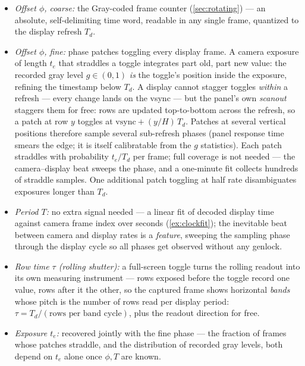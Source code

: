 \documentclass[11pt]{article}
\theoremstyle{definition}
\begin{document}
\begin{itemize}
  \item \emph{Offset $\phi$, coarse:} the Gray-coded frame counter
        (\autoref{sec:rotating}) --- an absolute, self-delimiting time
        word, readable in any single frame, quantized to the display
        refresh $T_d$.
  \item \emph{Offset $\phi$, fine:} phase patches toggling every display
        frame. A camera exposure of length $t_e$ that straddles a toggle
        integrates part old, part new value: the recorded gray level
        $g\in(0,1)$ \emph{is} the toggle's position inside the exposure,
        refining the timestamp below $T_d$. A display cannot stagger
        toggles \emph{within} a refresh --- every change lands on the
        vsync --- but the panel's own \emph{scanout} staggers them for
        free: rows are updated top-to-bottom across the refresh, so a
        patch at row $y$ toggles at
        $\text{vsync}+ (y/H)\,T_d$. Patches at several vertical
        positions therefore sample several sub-refresh phases (panel
        response time smears the edge; it is itself calibratable from
        the $g$ statistics). Each patch straddles with probability
        $t_e/T_d$ per frame; full coverage is not needed --- the
        camera--display beat sweeps the phase, and a one-minute fit
        collects hundreds of straddle samples. One additional patch
        toggling at half rate disambiguates exposures longer than
        $T_d$.
  \item \emph{Period $T$:} no extra signal needed --- a linear fit of
        decoded display time against camera frame index over seconds
        (\autoref{ex:clockfit}); the inevitable beat between camera and
        display rates is a \emph{feature}, sweeping the sampling phase
        through the display cycle so all phases get observed without any
        genlock.
  \item \emph{Row time $\tau$ (rolling shutter):} a full-screen toggle
        turns the rolling readout into its own measuring instrument ---
        rows exposed before the toggle record one value, rows after it
        the other, so the captured frame shows horizontal \emph{bands}
        whose pitch is the number of rows read per display period:
        $\tau = T_d / (\text{rows per band cycle})$, plus the readout
        direction for free.
  \item \emph{Exposure $t_e$:} recovered jointly with the fine phase ---
        the fraction of frames whose patches straddle, and the
        distribution of recorded gray levels, both depend on $t_e$ alone
        once $\phi, T$ are known.
\end{itemize}
\end{document}
